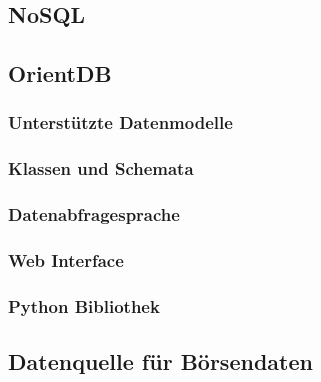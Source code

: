 \subsection{NoSQL}

\subsection{OrientDB}

\subsubsection{Unterstützte Datenmodelle}

\subsubsection{Klassen und Schemata}

\subsubsection{Datenabfragesprache}

\subsubsection{Web Interface}

\subsubsection{Python Bibliothek}

\subsection{Datenquelle für Börsendaten}

\clearpage